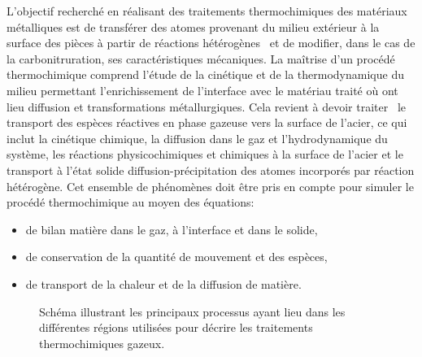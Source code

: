 L'objectif recherché en réalisant des traitements thermochimiques des matériaux métalliques est de transférer des atomes provenant du milieu extérieur à la surface des pièces à partir de réactions hétérogènes~\cite{Gantois2010} et de modifier, dans le cas de la carbonitruration, ses caractéristiques mécaniques. La maîtrise d'un procédé thermochimique comprend l'étude de la cinétique et de la thermodynamique du milieu permettant l'enrichissement de l'interface avec le matériau traité où ont lieu diffusion et transformations métallurgiques.  Cela revient à devoir traiter~\cite{Dulcy2007} le transport des espèces réactives en phase gazeuse vers la surface de l'acier, ce qui inclut la cinétique chimique, la diffusion dans le gaz et l'hydrodynamique du système, les réactions physicochimiques et chimiques à la surface de l'acier et le transport à l'état solide \textendash{} diffusion-précipitation \textendash{} des atomes incorporés par réaction hétérogène. Cet ensemble de phénomènes doit être pris en compte pour simuler le procédé thermochimique au moyen des équations: 
\begin{itemize}
  \item de bilan matière dans le gaz, à l'interface et dans le solide, 
  \item de conservation de la quantité de mouvement et des espèces, 
  \item de transport de la chaleur et de la diffusion de matière.
\end{itemize}

\begin{figure}[h]
  \centering{}
  
  \caption{\label{fig:schema-traitements}Schéma illustrant les principaux processus ayant lieu dans les différentes régions utilisées pour décrire les traitements thermochimiques gazeux.}
\end{figure}

